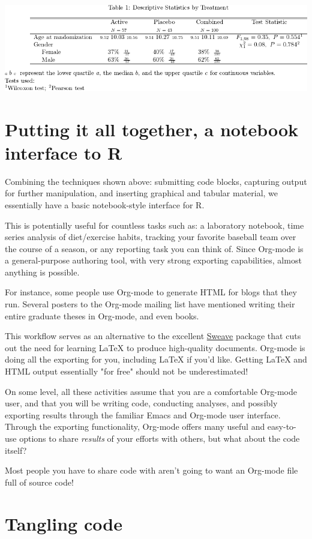 \documentclass[11pt]{article}
\begin{document}
\includegraphics[width=.9\linewidth]{hmisc.png}
\section*{Putting it all together, a notebook interface to R}
\label{sec-7}

Combining the techniques shown above: submitting code blocks, capturing output for further manipulation, and inserting graphical and tabular material, we essentially have a basic notebook-style interface for R.

This is potentially useful for countless tasks such as: a laboratory notebook, time series analysis of diet/exercise habits, tracking your favorite baseball team over the course of a season, or any reporting task you can think of. Since Org-mode is a general-purpose authoring tool, with very strong exporting capabilities, almost anything is possible.

For instance, some people use Org-mode to generate HTML for blogs that they run. Several posters to the Org-mode mailing list have mentioned writing their entire graduate theses in Org-mode, and even books.

This workflow serves as an alternative to the excellent \href{http://www.stat.uni-muenchen.de/~leisch/Sweave/}{Sweave} package that cuts out the need for learning \LaTeX{} to produce high-quality documents. Org-mode is doing all the exporting for you, including \LaTeX{} if you'd like. Getting \LaTeX{} and HTML output essentially "for free" should not be underestimated!

On some level, all these activities assume that you are a comfortable Org-mode user, and that you will be writing code, conducting analyses, and possibly exporting results through the familiar Emacs and Org-mode user interface. Through the exporting functionality, Org-mode offers many useful and easy-to-use options to share \emph{results} of your efforts with others, but what about the code itself? 

Most people you have to share code with aren't going to want an Org-mode file full of source code!
\section*{Tangling code}
\label{sec-8}
\end{document}
